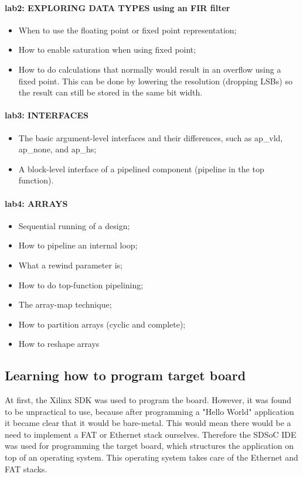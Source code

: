 \paragraph{lab2: EXPLORING DATA TYPES using an FIR filter}
\begin{itemize}
	\item When to use the floating point or fixed point representation;
	\item How to enable saturation when using fixed point;
	\item How to do calculations that normally would result in an overflow using a fixed point. This can be done by lowering the resolution (dropping LSBs) so the result can still be stored in the same bit width.
\end{itemize}

\paragraph{lab3: INTERFACES} 
\begin{itemize}
	\item The basic argument-level interfaces and their differences, such as ap\_vld, ap\_none, and ap\_hs;
	\item A block-level interface of a pipelined component (pipeline in the top function).
\end{itemize}


\paragraph{lab4: ARRAYS}
\begin{itemize}
	\item Sequential running of a design;
	\item How to pipeline an internal loop;
	\item What a rewind parameter is;
	\item How to do top-function pipelining;
	\item The array-map technique;
	\item How to partition arrays (cyclic and complete);
	\item How to reshape arrays
\end{itemize}

\subsection{Learning how to program target board}

At first, the Xilinx SDK was used to program the board. However, it was found to be unpractical to use, because after programming a "Hello World" application it became clear that it would be bare-metal. This would mean there would be a need to implement a FAT or Ethernet stack ourselves.
Therefore the SDSoC IDE was used for programming the target board, which structures the application on top of an operating system. This operating system takes care of the Ethernet and FAT stacks.

